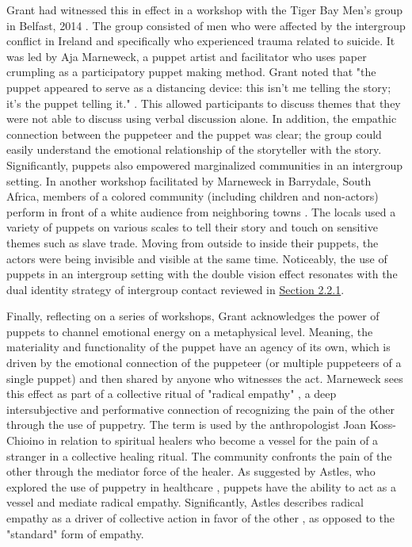 \documentclass[dissertation,math,vertlayout,pdfa,colorlinks]{aaltoseries}
\begin{document}
Grant had witnessed this in effect in a workshop with the Tiger Bay Men's group in Belfast, 2014 \cite[p. 5]{grantObjectsObjectivesApplied2020}. The group consisted of men who were affected by the intergroup conflict in Ireland and specifically who experienced trauma related to suicide. It was led by Aja Marneweck, a puppet artist and facilitator who uses paper crumpling as a participatory puppet making method. Grant noted that "the puppet appeared to serve as a distancing device: this isn’t me telling the story; it’s the puppet telling it." \cite[p. 5]{grantObjectsObjectivesApplied2020}. This allowed participants to discuss themes that they were not able to discuss using verbal discussion alone. In addition, the empathic connection between the puppeteer and the puppet was clear; the group could easily understand the emotional relationship of the storyteller with the story. Significantly, puppets also empowered marginalized communities in an intergroup setting. In another workshop facilitated by Marneweck in Barrydale, South Africa, members of a colored community (including children and non-actors) perform in front of a white audience from neighboring towns \cite[p. 6]{grantObjectsObjectivesApplied2020}. The locals used a variety of puppets on various scales to tell their story and touch on sensitive themes such as slave trade. Moving from outside to inside their puppets, the actors were being invisible and visible at the same time. Noticeably, the use of puppets in an intergroup setting with the double vision effect resonates with the dual identity strategy of intergroup contact reviewed in \hyperref[sec:dual_identity]{Section 2.2.1}. 

Finally, reflecting on a series of workshops, Grant acknowledges the power of puppets to channel emotional energy on a metaphysical level. Meaning, the materiality and functionality of the puppet have an agency of its own, which is driven by the emotional connection of the puppeteer (or multiple puppeteers of a single puppet) and then shared by anyone who witnesses the act. Marneweck sees this effect as part of a collective ritual of "radical empathy" \cite{marneweck2016a}, a deep intersubjective and performative connection of recognizing the pain of the other through the use of puppetry. The term is used by the anthropologist Joan Koss-Chioino \cite{koss-chioinoSpiritualTransformationRelation2006} in relation to spiritual healers who become a vessel for the pain of a stranger in a collective healing ritual. The community confronts the pain of the other through the mediator force of the healer. As suggested by Astles, who explored the use of puppetry in healthcare \cite{astlesWalkWalkMy2020}, puppets have the ability to act as a vessel and mediate radical empathy. Significantly, Astles describes radical empathy as a driver of collective action in favor of the other \cite{astlesWalkWalkMy2020}, as opposed to the "standard" form of empathy. 
\end{document}
